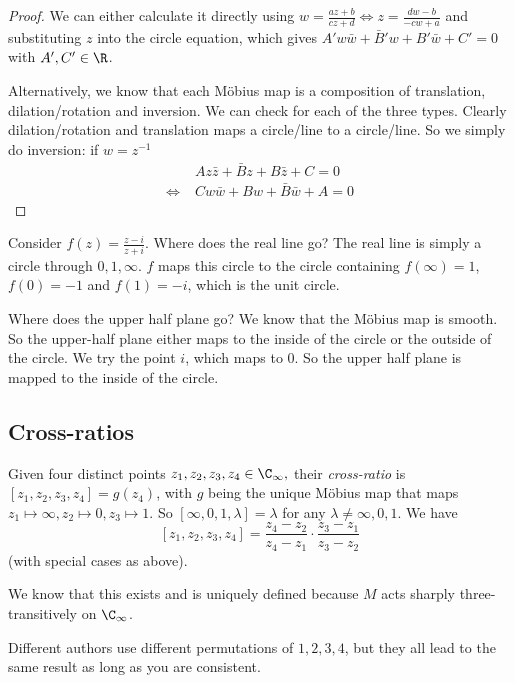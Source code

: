 \documentclass[a4paper]{article}
\begin{document}
  \begin{proof}
    We can either calculate it directly using $w = \frac{az + b}{cz + d}\Leftrightarrow z = \frac{dw - b}{-cw + a}$ and substituting $z$ into the circle equation, which gives $A' w\bar w + \bar B' w + B'\bar w + C' = 0$ with $A', C'\in \R$.

    Alternatively, we know that each M\"obius map is a composition of translation, dilation/rotation and inversion. We can check for each of the three types. Clearly dilation/rotation and translation maps a circle/line to a circle/line. So we simply do inversion: if $w = z^{-1}$
    \begin{align*}
      &\; Az\bar z + \bar Bz + B\bar z + C = 0\\
      \Leftrightarrow &\;  Cw\bar w + Bw + \bar B\bar w + A = 0
    \end{align*}
  \end{proof}

  \begin{eg}
    Consider $f(z) = \frac{z - i}{z + i}$. Where does the real line go? The real line is simply a circle through $0, 1, \infty$. $f$ maps this circle to the circle containing $f(\infty) = 1$, $f(0) = -1$ and $f(1) = -i$, which is the unit circle.

    Where does the upper half plane go? We know that the M\"obius map is smooth. So the upper-half plane either maps to the inside of the circle or the outside of the circle. We try the point $i$, which maps to $0$. So the upper half plane is mapped to the inside of the circle.
  \end{eg}
  \subsection{Cross-ratios}
  \begin{defi}
    Given four distinct points $z_1, z_2, z_3, z_4\in \C_\infty,$ their \emph{cross-ratio} is $[z_1, z_2, z_3, z_4] = g(z_4)$, with $g$ being the unique M\"obius map that maps $z_1\mapsto \infty, z_2\mapsto 0, z_3\mapsto 1$.  So $[\infty, 0, 1, \lambda] = \lambda$ for any $\lambda\not= \infty, 0, 1$. We have
    \[
      [z_1, z_2, z_3, z_4] = \frac{z_4 - z_2}{z_4 - z_1} \cdot \frac{z_3 - z_1}{z_3 - z_2}
    \]
    (with special cases as above).
  \end{defi}
  We know that this exists and is uniquely defined because $M$ acts sharply three-transitively on $\C_\infty$.

  \note Different authors use different permutations of $1, 2, 3, 4$, but they all lead to the same result as long as you are consistent.
\end{document}
